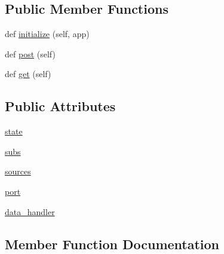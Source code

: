 \subsection*{Public Member Functions}
\begin{DoxyCompactItemize}
\item 
def \hyperlink{classparlai_1_1mturk_1_1webapp_1_1server_1_1RunListHandler_aea5350b7ea1536cacfc3dfff4ffe1f32}{initialize} (self, app)
\item 
def \hyperlink{classparlai_1_1mturk_1_1webapp_1_1server_1_1RunListHandler_a7ecee21fd9a47687af7466e502bba574}{post} (self)
\item 
def \hyperlink{classparlai_1_1mturk_1_1webapp_1_1server_1_1RunListHandler_a66e2a62b37bbcc83c70b25bbbbd64952}{get} (self)
\end{DoxyCompactItemize}
\subsection*{Public Attributes}
\begin{DoxyCompactItemize}
\item 
\hyperlink{classparlai_1_1mturk_1_1webapp_1_1server_1_1RunListHandler_a69b59cd4194adf73ffdc4feae1409df3}{state}
\item 
\hyperlink{classparlai_1_1mturk_1_1webapp_1_1server_1_1RunListHandler_ae6ca04b925262123737c06bb6ce2bc4a}{subs}
\item 
\hyperlink{classparlai_1_1mturk_1_1webapp_1_1server_1_1RunListHandler_a5cc19eca1f894c97d99c01ff02a18e02}{sources}
\item 
\hyperlink{classparlai_1_1mturk_1_1webapp_1_1server_1_1RunListHandler_a31542b109794f0748607b209c07f1a61}{port}
\item 
\hyperlink{classparlai_1_1mturk_1_1webapp_1_1server_1_1RunListHandler_a5084daae3aa6f6de486452498adbc2a1}{data\+\_\+handler}
\end{DoxyCompactItemize}


\subsection{Member Function Documentation}
\mbox{\label{classparlai_1_1mturk_1_1webapp_1_1server_1_1RunListHandler_a66e2a62b37bbcc83c70b25bbbbd64952}} 
